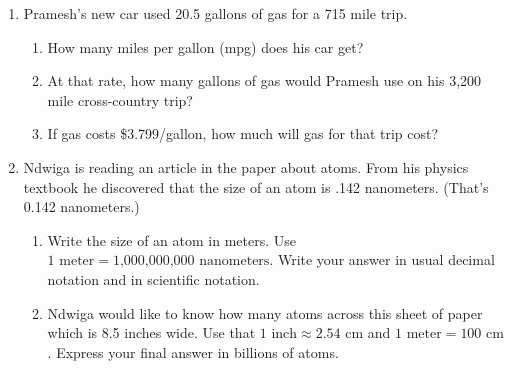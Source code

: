 \begin{enumerate}
\newpage

\item Pramesh's new car used 20.5 gallons of gas for a 715 mile trip. 
\begin{enumerate}
\item How many miles per gallon (mpg) does his car get? \vfill
\item At that rate, how many gallons of gas would Pramesh use on his 3,200 mile cross-country trip?  \vfill
\item If gas costs \$3.799/gallon, how much will gas for that trip cost?  \vfill
\end{enumerate}

\newpage

\item Ndwiga is reading an article in the paper about atoms.  From his physics textbook he discovered that the size of an atom is .142 nanometers.  (That's 0.142 nanometers.)
\begin{enumerate}
\item Write the size of an atom in meters.  Use $1 \text{ meter} = \text{1,000,000,000 nanometers}$.   Write your answer in usual decimal notation and in scientific notation. \vfill \vfill
\item Ndwiga would like to know how many atoms across this sheet of paper which is 8.5 inches wide. Use that $1 \text{ inch} \approx 2.54 \text{ cm}$ and $1 \text{ meter} = 100 \text{ cm}$.  Express your final answer in billions of atoms. \vfill \vfill \vfill
\end{enumerate}


\end{enumerate}

